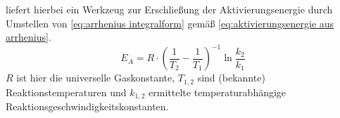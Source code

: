 	liefert hierbei ein Werkzeug zur Erschließung der Aktivierungsenergie durch Umstellen von \cref{eq:arrhenius integralform} gemäß \cref{eq:aktivierungsenergie aus arrhenius}.
	\begin{equation}
		E_A = R \cdot \left(\frac{1}{T_2} - \frac{1}{T_1}\right)^{-1} \ln{\frac{k_2}{k_1}}
		\label{eq:aktivierungsenergie aus arrhenius}
	\end{equation}
	\(R\) ist hier die universelle Gaskonstante, \(T_{1,2}\) sind (bekannte) Reaktionstemperaturen und \(k_{1,2}\)
	ermittelte temperaturabhängige Reaktionsgeschwindigkeitskonstanten.